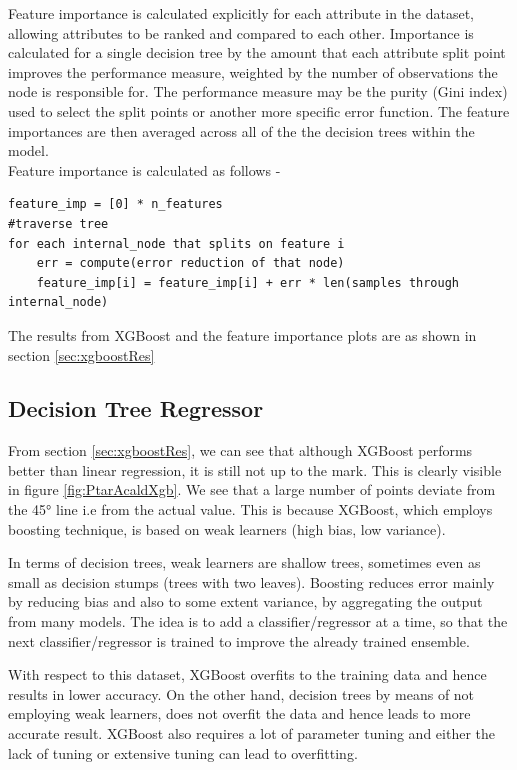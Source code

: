 \documentclass[12pt,chapterheads]{ucsd}
\begin{document}
Feature importance is calculated explicitly for each attribute in the dataset, allowing attributes to be ranked and compared to each other. Importance is calculated for a single decision tree by the amount that each attribute split point improves the performance measure, weighted by the number of observations the node is responsible for. The performance measure may be the purity (Gini index) used to select the split points or another more specific error function. The feature importances are then averaged across all of the the decision trees within the model.\\
Feature importance is calculated as follows -
\begin{verbatim}
feature_imp = [0] * n_features
#traverse tree
for each internal_node that splits on feature i
    err = compute(error reduction of that node)
    feature_imp[i] = feature_imp[i] + err * len(samples through internal_node)
\end{verbatim}
The results from XGBoost and the feature importance plots are as shown in section \ref{sec:xgboostRes}

\subsection{Decision Tree Regressor}
From section \ref{sec:xgboostRes}, we can see that although XGBoost performs better than linear regression, it is still not up to the mark. This is clearly visible in figure \ref{fig:PtarAcaldXgb}. We see that a large number of points deviate from the \ang{45} line i.e from the actual value. This is because XGBoost, which employs boosting technique, is based on weak learners \string(high bias, low variance).

In terms of decision trees, weak learners are shallow trees, sometimes even as small as decision stumps (trees with two leaves). Boosting reduces error mainly by reducing bias and also to some extent variance, by aggregating the output from many models. The idea is to add a classifier/regressor at a time, so that the next classifier/regressor is trained to improve the already trained ensemble.

With respect to this dataset, XGBoost overfits to the training data and hence results in lower accuracy. On the other hand, decision trees by means of not employing weak learners, does not overfit the data and hence leads to more accurate result. XGBoost also requires a lot of parameter tuning and either the lack of tuning or extensive tuning can lead to overfitting.
\end{document}
